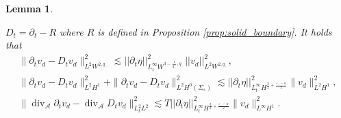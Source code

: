\documentclass[letterpaper,reqno,10pt,twoside]{amsart}
\newtheorem{lemma}[theorem]{Lemma}
\theoremstyle{definition}
\theoremstyle{remark}
\def\p{\partial}
\begin{document}
	\begin{lemma}\label{lem:difference_u_Dt_u}
		
		$D_{t}=\p_{t}-R$ where $R$ is defined in Proposition \ref{prop:solid_boundary}. It holds that
		\[
		\begin{aligned}
			\|\p_tv_{d}-D_tv_{d}\|_{L^2W^{2,q_-}}^2\lesssim \vert \vert \p_{t}\eta\vert \vert_{L_{t}^{\infty}W^{3-\frac{1}{q_{-}},q_{-}}}^{2}\vert \vert v_{d}\vert \vert_{L^{2}W^{2,q_{-}}}^{2},\\
			\|\p_t v_{d}-D_tv_{d}\|_{L^2H^1}^2+\|\p_tv_{d}-D_tv_{d}\|_{L^2H^0(\Sigma_s)}^2\lesssim \vert \vert \p_{t}\eta\vert \vert^{2}_{L_{t}^{\infty}H^{\frac{3}{2}+\frac{\varepsilon_{-}-\alpha}{2}}}\|v_{d}\|_{L^2H^1}^2,\\
			\|\operatorname{div}_{\mathcal{A}}\partial_{t}v_{d}-\operatorname{div}_{\mathcal{A}}D_{t}v_{d}\|^{2}_{L_{t}^{2}L^{2}}\lesssim T\vert \vert \p_{t}\eta\vert \vert^{2}_{L_{t}^{\infty}H^{\frac{3}{2}+\frac{\varepsilon_{-}-\alpha}{2}}}\|v_{d}\|_{L^\infty H^1}^2.
		\end{aligned}
		\]
	\end{lemma}
	
\end{document}
